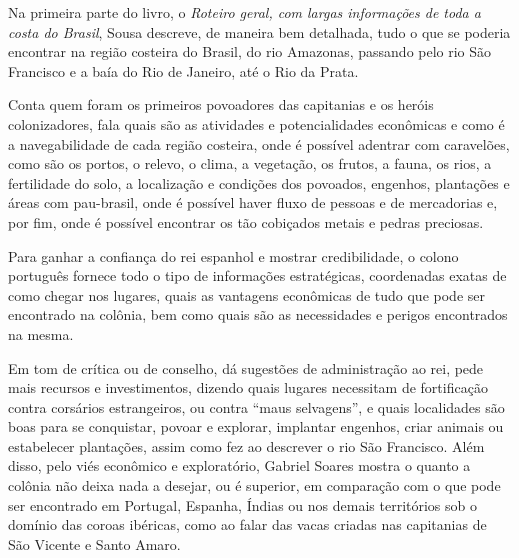 \documentclass[12pt]{extarticle}
\begin{document}
Na primeira parte do livro, o \emph{Roteiro geral, com largas informações de toda a costa do Brasil}, Sousa descreve, de maneira bem detalhada, tudo o que se poderia encontrar na região costeira do Brasil, do rio Amazonas, passando pelo rio São Francisco e a baía do Rio de Janeiro, até o Rio da Prata.

Conta quem foram os primeiros povoadores das capitanias e os heróis colonizadores, fala quais são as atividades e potencialidades econômicas e como é a navegabilidade de cada região costeira, onde é possível adentrar com caravelões, como são os portos, o relevo, o clima, a vegetação, os frutos, a fauna, os rios, a fertilidade do solo, a localização e condições dos povoados, engenhos, plantações e áreas com pau-brasil, onde é possível haver fluxo de pessoas e de mercadorias e, por fim, onde é possível encontrar os tão cobiçados metais e pedras preciosas.

Para ganhar a confiança do rei espanhol e mostrar credibilidade, o colono português fornece todo o tipo de informações estratégicas, coordenadas exatas de como chegar nos lugares, quais as vantagens econômicas de tudo que pode ser encontrado na colônia, bem como quais são as necessidades e perigos encontrados na mesma.

Em tom de crítica ou de conselho, dá sugestões de administração ao rei, pede mais recursos e investimentos, dizendo quais lugares necessitam de fortificação contra corsários estrangeiros, ou contra ``maus selvagens'', e quais localidades são boas para se conquistar, povoar e explorar, implantar engenhos, criar animais ou estabelecer plantações, assim como fez ao descrever o rio São Francisco.
Além disso, pelo viés econômico e exploratório, Gabriel Soares mostra o quanto a colônia não deixa nada a desejar, ou é superior, em comparação com o que pode ser encontrado em Portugal, Espanha, Índias ou nos demais territórios sob o domínio das coroas ibéricas, como ao falar das vacas criadas nas capitanias de São Vicente e Santo Amaro. 



\end{document}
